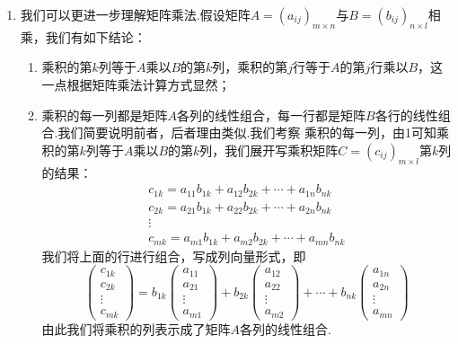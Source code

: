 \begin{enumerate}
    \item 我们可以更进一步理解矩阵乘法.假设矩阵$A=(a_{ij})_{m\times n}$与$B=(b_{ij})_{n\times l}$相乘，我们有如下结论：
    \begin{enumerate}
        \item 乘积的第$k$列等于$A$乘以$B$的第$k$列，乘积的第$j$行等于$A$的第$j$行乘以$B$，这一点根据矩阵乘法计算方式显然；
        \item 乘积的每一列都是矩阵$A$各列的线性组合，每一行都是矩阵$B$各行的线性组合.我们简要说明前者，后者理由类似.我们考察
        乘积的每一列，由1可知乘积的第$k$列等于$A$乘以$B$的第$k$列，我们展开写乘积矩阵$C=(c_{ij})_{m\times l}$第$k$列的结果：
        \begin{gather*}
            c_{1k}=a_{11}b_{1k}+a_{12}b_{2k}+\cdots+a_{1n}b_{nk} \\
            c_{2k}=a_{21}b_{1k}+a_{22}b_{2k}+\cdots+a_{2n}b_{nk} \\
            \vdots \\
            c_{mk}=a_{m1}b_{1k}+a_{m2}b_{2k}+\cdots+a_{mn}b_{nk}
        \end{gather*}
        我们将上面的行进行组合，写成列向量形式，即
        \[\begin{pmatrix}
            c_{1k} \\ c_{2k} \\ \vdots \\ c_{mk}
        \end{pmatrix}=b_{1k}\begin{pmatrix}
            a_{11} \\ a_{21} \\ \vdots \\ a_{m1}
        \end{pmatrix}+b_{2k}\begin{pmatrix}
            a_{12} \\ a_{22} \\ \vdots \\ a_{m2}
        \end{pmatrix}+\cdots+b_{nk}\begin{pmatrix}
            a_{1n} \\ a_{2n} \\ \vdots \\ a_{mn}
        \end{pmatrix}\]
        由此我们将乘积的列表示成了矩阵$A$各列的线性组合.
    \end{enumerate}


\end{enumerate}
